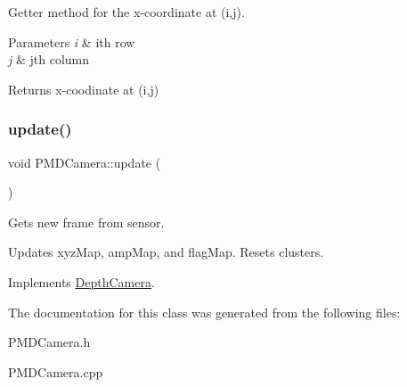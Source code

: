Getter method for the x-\/coordinate at (i,j). 


\begin{DoxyParams}{Parameters}
{\em i} & ith row \\
\hline
{\em j} & jth column \\
\hline
\end{DoxyParams}
\begin{DoxyReturn}{Returns}
x-\/coodinate at (i,j) 
\end{DoxyReturn}
\hypertarget{class_p_m_d_camera_aa6cb9398f9635436b4384ee2043def40}{}\label{class_p_m_d_camera_aa6cb9398f9635436b4384ee2043def40} 
\subsubsection{\texorpdfstring{update()}{update()}}
{\footnotesize\ttfamily void P\+M\+D\+Camera\+::update (\begin{DoxyParamCaption}{ }\end{DoxyParamCaption})\hspace{0.3cm}{\ttfamily [virtual]}}



Gets new frame from sensor. 

Updates xyz\+Map, amp\+Map, and flag\+Map. Resets clusters. 

Implements \hyperlink{class_depth_camera_abae1b9f37a00b17f00ff983ebb43ffc5}{Depth\+Camera}.



The documentation for this class was generated from the following files\+:\begin{DoxyCompactItemize}
\item 
P\+M\+D\+Camera.\+h\item 
P\+M\+D\+Camera.\+cpp\end{DoxyCompactItemize}
